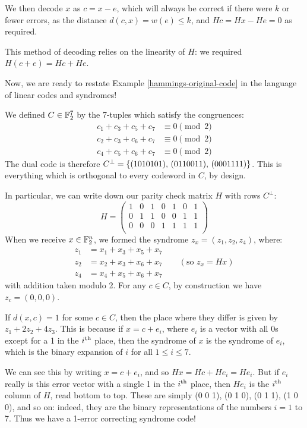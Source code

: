 \documentclass{article}
\begin{document}
We then decode $x$ as $c = x - e$, which will always be correct if there were $k$ or fewer errors, as the distance $d(c, x) = w(e) \leq k$, and $Hc = Hx - He = 0$ as required.

\begin{note}
	This method of decoding relies on the linearity of $H$: we required $H(c + e) = Hc + He$.
\end{note}

Now, we are ready to restate Example \ref{hammings-original-code} in the language of linear codes and syndromes!

\begin{example}
	\label{hamming-original-code-redux}
    We defined $C \in \mathbb{F}_2^7$ by the 7-tuples
    which satisfy the congruences:
    \begin{align*}
    	c_1 + c_3 + c_5 + c_7 &\equiv 0 \pmod 2 \\
    	c_2 + c_3 + c_6 + c_7 &\equiv 0 \pmod 2 \\
    	c_4 + c_5 + c_6 + c_7 &\equiv 0 \pmod 2
	\end{align*}
	The dual code is therefore $C^\bot = \left\lbrace (1010101), \, (0110011), \, (0001111) \right\rbrace$.
	This is everything which is orthogonal to every codeword in $C$, by design.
	
	In particular, we can write down our parity check matrix $H$ with rows $C^\bot$:
	\[
	H = \begin{pmatrix}
		1 & 0 & 1 & 0 & 1 & 0 & 1 \\
		0 & 1 & 1 & 0 & 0 & 1 & 1 \\
		0 & 0 & 0 & 1 & 1 & 1 & 1 \\
	\end{pmatrix}
	\]
	When we receive $x \in \mathbb{F}_2^n$, we formed the syndrome $z_x = (z_1, z_2, z_4)$, where:
	\begin{align*}
    	z_1 &= x_1 + x_3 + x_5 + x_7 \\
    	z_2 &= x_2 + x_3 + x_6 + x_7 \qquad (\text{so } z_x = H x) \\
    	z_4 &= x_4 + x_5 + x_6 + x_7
	\end{align*}
	with addition taken modulo 2.
	For any $c \in C$, by construction we have $z_c = (0, 0, 0)$.
	
	If $d(x, c) = 1$ for some $c \in C$,
	then the place where they differ is given by $z_1 + 2z_2 + 4z_3$.
	This is because if $x = c + e_i$,
	where $e_i$ is a vector with all 0s
	except for a 1 in the $i^{\text{th}}$ place,
	then the syndrome of $x$ is the syndrome of $e_i$,
	which is the binary expansion of $i$ for all $1 \leq i \leq 7$.
	
	We can see this by writing $x = c + e_i$, and so $Hx = Hc + He_i = He_i$.
	But if $e_i$ really is this error vector with a single 1 in the $i^{\text{th}}$ place, then $He_i$ is the $i^{\text{th}}$ column of $H$, read bottom to top.
	These are simply (0 0 1), (0 1 0), (0 1 1), (1 0 0), and so on: indeed, they are the binary representations of the numbers $i = 1$ to 7. Thus we have a 1-error correcting syndrome code!
\end{example}
\end{document}
